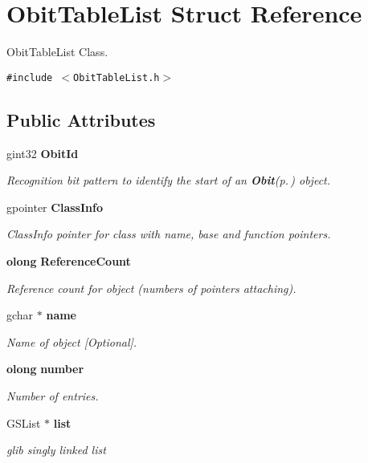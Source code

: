 \section{Obit\-Table\-List Struct Reference}
\label{structObitTableList}
Obit\-Table\-List Class.  


{\tt \#include $<$Obit\-Table\-List.h$>$}

\subsection*{Public Attributes}
\begin{CompactItemize}
\item 
gint32 {\bf Obit\-Id}
\begin{CompactList}\small\item\em Recognition bit pattern to identify the start of an {\bf Obit}{\rm (p.\,\pageref{structObit})} object. \item\end{CompactList}\item 
gpointer {\bf Class\-Info}
\begin{CompactList}\small\item\em Class\-Info pointer for class with name, base and function pointers. \item\end{CompactList}\item 
{\bf olong} {\bf Reference\-Count}
\begin{CompactList}\small\item\em Reference count for object (numbers of pointers attaching). \item\end{CompactList}\item 
gchar $\ast$ {\bf name}
\begin{CompactList}\small\item\em Name of object [Optional]. \item\end{CompactList}\item 
{\bf olong} {\bf number}
\begin{CompactList}\small\item\em Number of entries. \item\end{CompactList}\item 
GSList $\ast$ {\bf list}
\begin{CompactList}\small\item\em glib singly linked list \item\end{CompactList}\end{CompactItemize}


